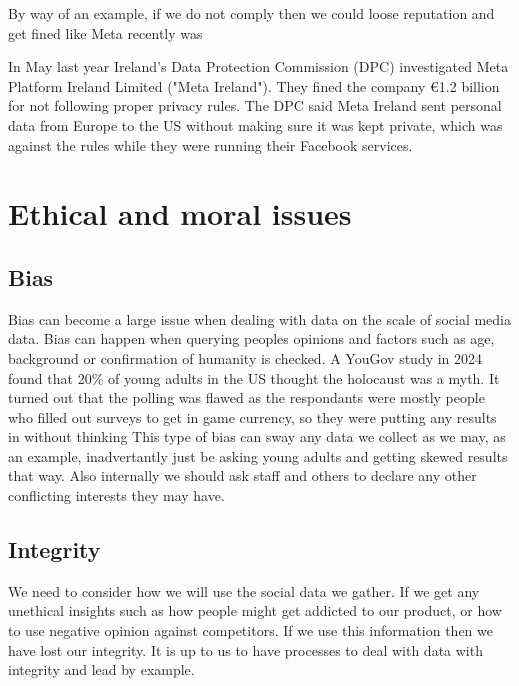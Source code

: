 \documentclass{article}
\begin{document}
By way of an example, if we do not comply then we could loose reputation and get fined like Meta recently was

In May last year Ireland's Data Protection Commission (DPC) investigated Meta Platform Ireland Limited ("Meta Ireland"). They fined the company €1.2 billion for not following proper privacy rules. The DPC said Meta Ireland sent personal data from Europe to the US without making sure it was kept private, which was against the rules while they were running their Facebook services. \cite{Meta}

\newpage
\section{Ethical and moral issues}
\subsection{Bias}
Bias can become a large issue when dealing with data on the scale of social media data. Bias can happen when querying peoples opinions and factors such as age, background or confirmation of humanity is checked. A YouGov study in 2024 found that 20\% of young adults in the US thought the holocaust was a myth. It turned out that the polling was flawed as the respondants were mostly people who filled out surveys to get in game currency, so they were putting any results in without thinking \cite{moreorless}
This type of bias can sway any data we collect as we may, as an example, inadvertantly just be asking young adults and getting skewed results that way. Also internally we should ask staff and others to declare any other conflicting interests they may have.


\subsection{Integrity}
We need to consider how we will use the social data we gather. If we get any unethical insights such as how people might get addicted to our product, or how to use negative opinion against competitors. If we use this information then we have lost our integrity. It is up to us to have processes to deal with data with integrity and lead by example.


\end{document}
